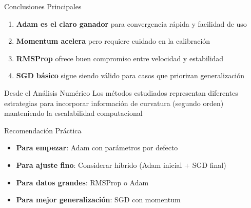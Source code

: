 \documentclass[10pt]{beamer}
\begin{document}
\begin{frame}{Conclusiones Principales}
\begin{enumerate}
\item \textbf{Adam es el claro ganador} para convergencia rápida y facilidad de uso
\item \textbf{Momentum acelera} pero requiere cuidado en la calibración
\item \textbf{RMSProp} ofrece buen compromiso entre velocidad y estabilidad
\item \textbf{SGD básico} sigue siendo válido para casos que priorizan generalización
\end{enumerate}

\begin{block}{Desde el Análisis Numérico}
Los métodos estudiados representan diferentes estrategias para incorporar información de curvatura (segundo orden) manteniendo la escalabilidad computacional
\end{block}

\begin{alertblock}{Recomendación Práctica}
\begin{itemize}
\item \textbf{Para empezar}: Adam con parámetros por defecto
\item \textbf{Para ajuste fino}: Considerar híbrido (Adam inicial + SGD final)
\item \textbf{Para datos grandes}: RMSProp o Adam
\item \textbf{Para mejor generalización}: SGD con momentum
\end{itemize}
\end{alertblock}
\end{frame}
\end{document}
